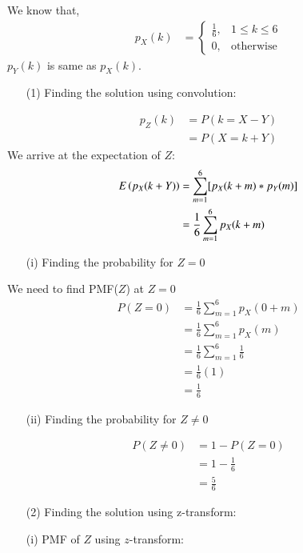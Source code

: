 \documentclass[journal,12pt,twocolumn]{IEEEtran}
\theoremstyle{remark}
\begin{document}
We know that,
\begin{align}
p_X(k) &= 
	\begin{cases}
		\frac{1}{6}, & 1 \leq k \leq 6 \\
		0, & \text{otherwise}
	\end{cases}
\end{align}
$p_Y(k)$ is same as $p_X(k)$.
\begin{enumerate}
\item[(1)] Finding the solution using convolution:
\end{enumerate}
\begin{align}
p_Z(k) &= P(k = X-Y)\\
&= P(X = k+Y)
\end{align}
We arrive at the expectation of $Z$: 
\begin{align}
E\left(p_X(k+Y)\right) &= \sum^{6}_{m=1}[p_X(k+m)*p_Y(m)]\\
&= \frac{1}{6}\sum^6_{m=1} p_X(k+m) \label{eq:Expectation}
\end{align}
\begin{enumerate}
\item[(i)] Finding the probability for $Z = 0$
\end{enumerate}
We need to find PMF($Z$) at $Z = 0$
\begin{align}
	P(Z=0) &= \frac{1}{6}\sum^6_{m=1} p_X(0+m)\\
	&= \frac{1}{6}\sum^6_{m=1} p_X(m)\\
	&= \frac{1}{6}\sum^6_{m=1}\frac{1}{6}\\
	&= \frac{1}{6}(1)\\
	&= \frac{1}{6}	
\end{align}
\begin{enumerate}
\item[(ii)] Finding the probability for $Z \neq 0$
\end{enumerate}
\begin{align}
	P(Z \neq 0) &= 1-P(Z=0)\\
	&= 1-\frac{1}{6}\\
	&= \frac{5}{6}
\end{align}
\begin{enumerate}
\item[(2)] Finding the solution using z-transform:
\end{enumerate}
\begin{enumerate}
\item[(i)] PMF of $Z$ using $z$-transform:
\end{enumerate}
\end{document}
